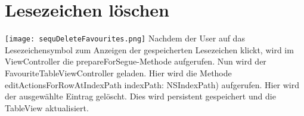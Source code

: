 \section{Lesezeichen löschen}
\texttt{[image: sequDeleteFavourites.png]}
Nachdem der User auf das Lesezeichensymbol zum Anzeigen der gespeicherten Lesezeichen klickt, wird im ViewController die prepareForSegue-Methode aufgerufen. Nun wird der FavouriteTableViewController geladen. Hier wird die Methode editActionsForRowAtIndexPath indexPath: NSIndexPath) aufgerufen. Hier wird der ausgewählte Eintrag gelöscht. Dies wird persistent gespeichert und die TableView aktualisiert.
\pagebreak

